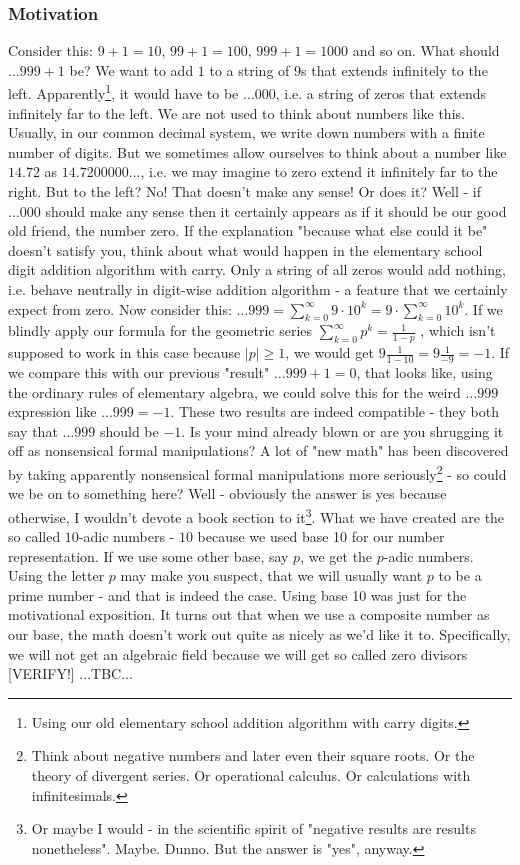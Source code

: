 \subsubsection{Motivation}
Consider this: $9 + 1 = 10$, $99 + 1 = 100$, $999 + 1 = 1000$ and so on. What should $\ldots 999 + 1$ be? We want to add $1$ to a string of $9$s that extends infinitely to the left. Apparently\footnote{Using our old elementary school addition algorithm with carry digits.}, it would have to be $\ldots 000$, i.e. a string of zeros that extends infinitely far to the left. We are not used to think about numbers like this. Usually, in our common decimal system, we write down numbers with a finite number of digits. But we sometimes allow ourselves to think about a number like $14.72$ as $14.7200000\ldots$, i.e. we may imagine to zero extend it infinitely far to the right. But to the left? No! That doesn't make any sense! Or does it? Well - if $\ldots 000$ should make any sense then it certainly appears as if it should be our good old friend, the number zero. If the explanation "because what else could it be" doesn't satisfy you, think about what would happen in the elementary school digit addition algorithm with carry. Only a string of all zeros would add nothing, i.e. behave neutrally in digit-wise addition algorithm - a feature that we certainly expect from zero. Now consider this: $\ldots 999  = \sum_{k=0}^{\infty} 9 \cdot 10^k = 9 \cdot \sum_{k=0}^{\infty} 10^k$. If we blindly apply our formula for the geometric series $\sum_{k=0}^{\infty} p^k = \frac{1}{1-p}$ , which isn't supposed to work in this case because $|p| \geq 1$, we would get $9 \frac{1}{1-10} = 9 \frac{1}{-9} = -1$. If we compare this with our previous "result" $\ldots 999 + 1 = 0$, that looks like, using the ordinary rules of elementary algebra, we could solve this for the weird $\ldots999$ expression like $\ldots 999 = -1$. These two results are indeed compatible - they both say that  $\ldots 999$ should be $-1$. Is your mind already blown or are you shrugging it off as nonsensical formal manipulations? A lot of "new math" has been discovered by taking apparently nonsensical formal manipulations more seriously\footnote{Think about negative numbers and later even their square roots. Or the theory of divergent series. Or operational calculus. Or calculations with infinitesimals.} - so could we be on to something here? Well - obviously the answer is yes because otherwise, I wouldn't devote a book section to it\footnote{Or maybe I would - in the scientific spirit of "negative results are results nonetheless". Maybe. Dunno. But the answer is "yes", anyway.}. What we have created are the so called $10$-adic numbers - $10$ because we used base 10 for our number representation. If we use some other base, say $p$, we get the $p$-adic numbers. Using the letter $p$ may make you suspect, that we will usually want $p$ to be a prime number - and that is indeed the case. Using base 10 was just for the motivational exposition. It turns out that when we use a composite number as our base, the math doesn't work out quite as nicely as we'd like it to. Specifically, we will not get an algebraic field because we will get so called zero divisors [VERIFY!] ...TBC...

